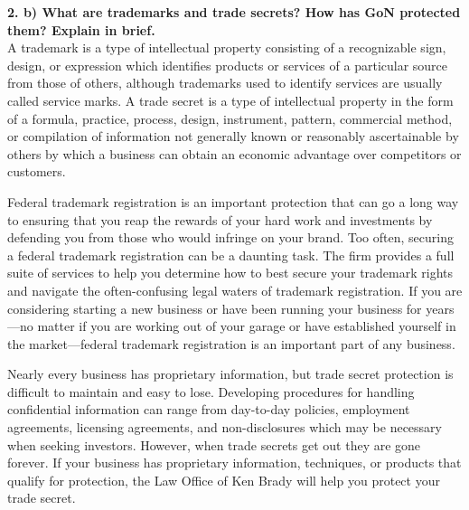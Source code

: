\documentclass [12pt, a4paper]{article}
\begin{document}
\large
\textbf{2. b) What are trademarks and trade secrets? How has GoN protected them? Explain in brief.}\\
\normalsize
A trademark is a type of intellectual property consisting of a recognizable sign, design, or expression which identifies products or services of a particular source from those of others, although trademarks used to identify services are usually called service marks. A trade secret is a type of intellectual property in the form of a formula, practice, process, design, instrument, pattern, commercial method, or compilation of information not generally known or reasonably ascertainable by others by which a business can obtain an economic advantage over competitors or customers.\\
\par
Federal trademark registration is an important protection that can go a long way to ensuring that you reap the rewards of your hard work and investments by defending you from those who would infringe on your brand. Too often, securing a federal trademark registration can be a daunting task. The firm provides a full suite of services to help you determine how to best secure your trademark rights and navigate the often-confusing legal waters of trademark registration. If you are considering starting a new business or have been running your business for years—no matter if you are working out of your garage or have established yourself in the market—federal trademark registration is an important part of any business. \\
\par
Nearly every business has proprietary information, but trade secret protection is difficult to maintain and easy to lose. Developing procedures for handling confidential information can range from day-to-day policies, employment agreements, licensing agreements, and non-disclosures which may be necessary when seeking investors. However, when trade secrets get out they are gone forever. If your business has proprietary information, techniques, or products that qualify for protection, the Law Office of Ken Brady will help you protect your trade secret.\\
\end{document}
